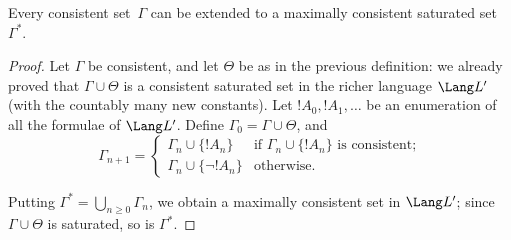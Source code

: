 \documentclass[../../include/open-logic-section]{subfiles}
\begin{document}

\begin{lem}
Every consistent set~$\Gamma$ can be extended to a maximally
consistent saturated set~$\Gamma^*$.
\end{lem}

\begin{proof}
Let $\Gamma$ be consistent, and let $\Theta$ be as in the previous
definition: we already proved that $\Gamma \cup \Theta$ is a
consistent saturated set in the richer language $\Lang L'$ (with the
countably many new constants). Let $!A_0, !A_1, \dots$ be an
enumeration of all the formulae of $\Lang L'$. Define $\Gamma_0 =
\Gamma \cup \Theta$, and
\[
\Gamma_{n+1} =
\begin{cases}
\Gamma_n \cup \{ !A_n \} & \textrm{if $\Gamma_n \cup \{!A_n\}$ is
  consistent;} \\ 
\Gamma_n \cup \{ \lnot !A_n \} & \textrm{otherwise.}
\end{cases}
\]

Putting $\Gamma^* = \bigcup_{n \geq 0} \Gamma_n$, we obtain a maximally consistent 
set in $\Lang L'$; since $\Gamma \cup \Theta$ is saturated, so is $\Gamma^*$. 

\end{proof}
\end{document}
